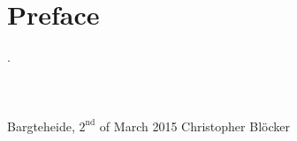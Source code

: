 $\;$
\clearpage
\thispagestyle{empty}
\renewcommand*{\dictumwidth}{.45\textwidth}

\section*{Preface}
. \\
\\
\\
\\
\noindent
Bargteheide, $2^\text{nd}$ of March 2015 \hfill Christopher Blöcker
